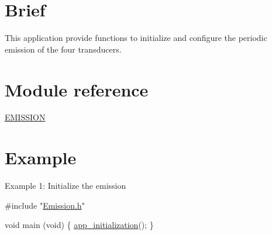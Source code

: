 \hypertarget{_s_t_m32__s_i_g_n_a_l__e_m_i_s_s_i_o_n_EMISSION_intro}{}\section{Brief}\label{_s_t_m32__s_i_g_n_a_l__e_m_i_s_s_i_o_n_EMISSION_intro}
This application provide functions to initialize and configure the periodic emission of the four transducers.\hypertarget{_s_t_m32__s_i_g_n_a_l__e_m_i_s_s_i_o_n_EMISSION_reference}{}\section{Module reference}\label{_s_t_m32__s_i_g_n_a_l__e_m_i_s_s_i_o_n_EMISSION_reference}

\begin{DoxyItemize}
\item \hyperlink{group___emission___module}{E\+M\+I\+S\+S\+I\+O\+N}
\end{DoxyItemize}\hypertarget{_s_t_m32__s_i_g_n_a_l__e_m_i_s_s_i_o_n_EMISSION_exemples}{}\section{Example}\label{_s_t_m32__s_i_g_n_a_l__e_m_i_s_s_i_o_n_EMISSION_exemples}
Example 1\+: Initialize the emission


\begin{DoxyCode}
\textcolor{preprocessor}{#include "\hyperlink{_emission_8h}{Emission.h}"}

\textcolor{keywordtype}{void} main (\textcolor{keywordtype}{void})
\{
   \hyperlink{group___emission___function_ga0286d33091b7353c6f70cbc413767cfc}{app\_initialization}();
\}
\end{DoxyCode}
 